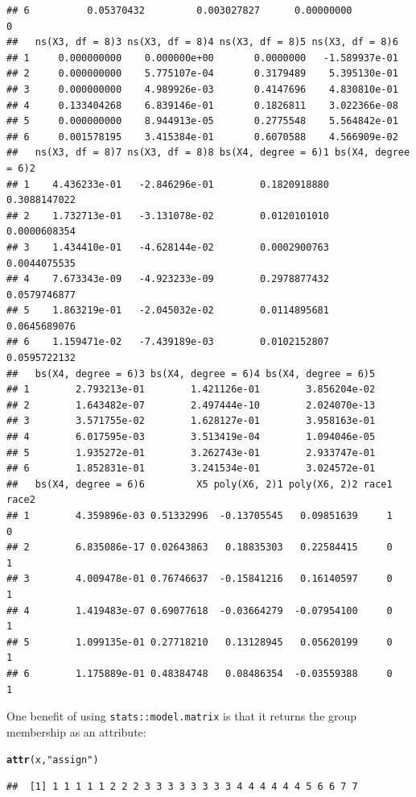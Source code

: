 \documentclass[12pt,letter]{article}\usepackage[]{graphicx}\usepackage[]{color}
\makeatletter
\newcommand{\hlstr}[1]{\textcolor[rgb]{0.192,0.494,0.8}{#1}}%
\newcommand{\hlstd}[1]{\textcolor[rgb]{0.345,0.345,0.345}{#1}}%
\newcommand{\hlkwd}[1]{\textcolor[rgb]{0.737,0.353,0.396}{\textbf{#1}}}%
\newenvironment{kframe}{%
 \def\at@end@of@kframe{}%
 \ifinner\ifhmode%
  \def\at@end@of@kframe{\end{minipage}}%
  \begin{minipage}{\columnwidth}%
 \fi\fi%
 \def\FrameCommand##1{\hskip\@totalleftmargin \hskip-\fboxsep
 \colorbox{shadecolor}{##1}\hskip-\fboxsep
     \hskip-\linewidth \hskip-\@totalleftmargin \hskip\columnwidth}%
 \MakeFramed {\advance\hsize-\width
   \@totalleftmargin\z@ \linewidth\hsize
   \@setminipage}}%
 {\par\unskip\endMakeFramed%
 \at@end@of@kframe}
\newenvironment{knitrout}{}{} %
\makeatother
\begin{document}
\begin{knitrout}
\begin{kframe}
\begin{verbatim}
## 6          0.05370432         0.003027827      0.00000000               0
##   ns(X3, df = 8)3 ns(X3, df = 8)4 ns(X3, df = 8)5 ns(X3, df = 8)6
## 1     0.000000000    0.000000e+00       0.0000000   -1.589937e-01
## 2     0.000000000    5.775107e-04       0.3179489    5.395130e-01
## 3     0.000000000    4.989926e-03       0.4147696    4.830810e-01
## 4     0.133404268    6.839146e-01       0.1826811    3.022366e-08
## 5     0.000000000    8.944913e-05       0.2775548    5.564842e-01
## 6     0.001578195    3.415384e-01       0.6070588    4.566909e-02
##   ns(X3, df = 8)7 ns(X3, df = 8)8 bs(X4, degree = 6)1 bs(X4, degree = 6)2
## 1    4.436233e-01   -2.846296e-01        0.1820918880        0.3088147022
## 2    1.732713e-01   -3.131078e-02        0.0120101010        0.0000608354
## 3    1.434410e-01   -4.628144e-02        0.0002900763        0.0044075535
## 4    7.673343e-09   -4.923233e-09        0.2978877432        0.0579746877
## 5    1.863219e-01   -2.045032e-02        0.0114895681        0.0645689076
## 6    1.159471e-02   -7.439189e-03        0.0102152807        0.0595722132
##   bs(X4, degree = 6)3 bs(X4, degree = 6)4 bs(X4, degree = 6)5
## 1        2.793213e-01        1.421126e-01        3.856204e-02
## 2        1.643482e-07        2.497444e-10        2.024070e-13
## 3        3.571755e-02        1.628127e-01        3.958163e-01
## 4        6.017595e-03        3.513419e-04        1.094046e-05
## 5        1.935272e-01        3.262743e-01        2.933747e-01
## 6        1.852831e-01        3.241534e-01        3.024572e-01
##   bs(X4, degree = 6)6         X5 poly(X6, 2)1 poly(X6, 2)2 race1 race2
## 1        4.359896e-03 0.51332996  -0.13705545   0.09851639     1     0
## 2        6.835086e-17 0.02643863   0.18835303   0.22584415     0     1
## 3        4.009478e-01 0.76746637  -0.15841216   0.16140597     0     1
## 4        1.419483e-07 0.69077618  -0.03664279  -0.07954100     0     1
## 5        1.099135e-01 0.27718210   0.13128945   0.05620199     0     1
## 6        1.175889e-01 0.48384748   0.08486354  -0.03559388     0     1
\end{verbatim}
\end{kframe}
\end{knitrout}

One benefit of using \texttt{stats::model.matrix} is that it returns the group membership as an attribute:

\begin{knitrout}\scriptsize
{}\color{fgcolor}\begin{kframe}
\begin{alltt}
\hlkwd{attr}\hlstd{(x,} \hlstr{"assign"}\hlstd{)}
\end{alltt}
\begin{verbatim}
##  [1] 1 1 1 1 1 2 2 2 3 3 3 3 3 3 3 3 4 4 4 4 4 4 5 6 6 7 7
\end{verbatim}
\end{kframe}
\end{knitrout}
\end{document}
